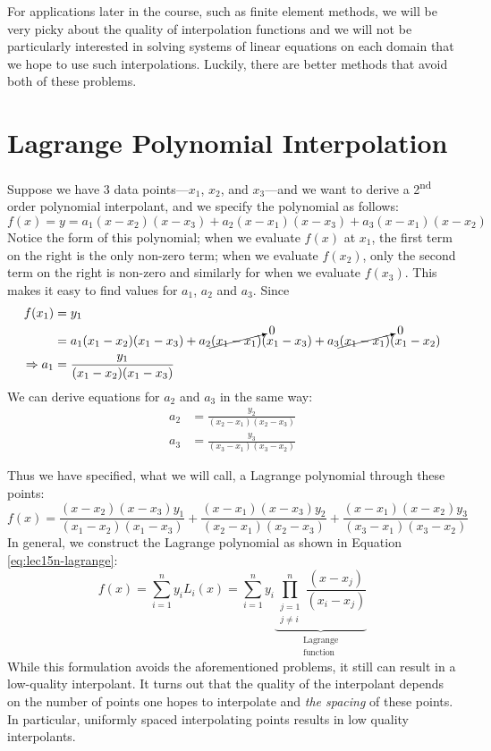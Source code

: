 \noindent For applications later in the course, such as finite element methods, we will be very picky about the quality of interpolation functions and we will not be particularly interested in solving systems of linear equations on each domain that we hope to use such interpolations.  Luckily, there are better methods that avoid both of these problems.

\section{Lagrange Polynomial Interpolation}

Suppose we have 3 data points---$x_1$, $x_2$, and $x_3$---and we want to derive a 2\textsuperscript{nd} order polynomial interpolant, and we specify the polynomial as follows:
\begin{equation*}
f(x) = y = a_1(x-x_2)(x-x_3) + a_2(x-x_1)(x-x_3) + a_3(x-x_1)(x-x_2)
\end{equation*}
Notice the form of this polynomial; when we evaluate $f(x)$ at $x_1$, the first term on the right is the only non-zero term; when we evaluate $f(x_2)$, only the second term on the right is non-zero and similarly for when we evaluate $f(x_3)$.  This makes it easy to find values for $a_1$, $a_2$ and $a_3$.  Since
\begin{align*}
f(x_1) &= y_1 \\
&=a_1(x_1 - x_2)(x_1 - x_3) + a_2 \cancelto{0}{(x_1 - x_1)}(x_1 - x_3) + a_3\cancelto{0}{(x_1 - x_1)}(x_1 - x_2) \\
\Rightarrow a_1 &= \frac{y_1}{(x_1 - x_2)(x_1 - x_3)} 
\end{align*}
We can derive equations for $a_2$ and $a_3$ in the same way:
\begin{align*}
a_2 & = \frac{y_2}{(x_2 - x_1)(x_2 - x_3)} \\
a_3 & = \frac{y_3}{(x_3 - x_1)(x_3 - x_2)}
\end{align*}

\noindent Thus we have specified, what we will call, a Lagrange polynomial through these points:
\begin{equation*}
f(x) = \frac{(x - x_2)(x - x_3)y_1}{(x_1 - x_2)(x_1 - x_3)} + \frac{(x - x_1)(x-x_3)y_2}{(x_2 - x_1)(x_2 - x_3)} + \frac{(x - x_1)(x-x_2)y_3}{(x_3-x_1)(x_3 - x_2)}
\end{equation*}
In general, we construct the Lagrange polynomial as shown in Equation \ref{eq:lec15n-lagrange}:
\begin{equation}
f(x) = \sum\limits_{i=1}^{n} y_i L_i(x) = \sum\limits_{i=1}^{n} y_i \underbrace{\prod_{\substack{j=1 \\ j \ne i}}^{n} \frac{(x - x_j)}{(x_i - x_j)}}_{\substack{\text{Lagrange} \\ \text{function}}}
\label{eq:lec15n-lagrange}
\end{equation}
While this formulation avoids the aforementioned problems, it still can result in a low-quality interpolant.  It turns out that the quality of the interpolant depends on the number of points one hopes to interpolate and \emph{the spacing} of these points.  In particular, uniformly spaced interpolating points results in low quality interpolants.

